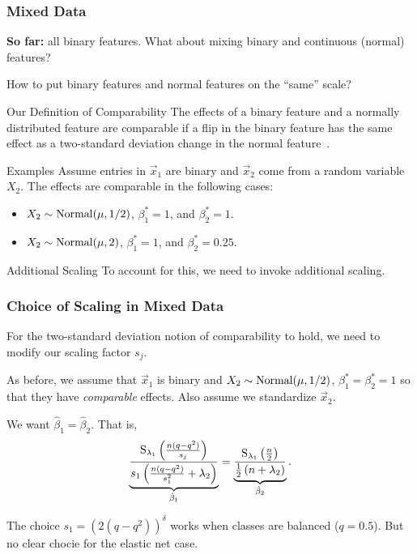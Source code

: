 \documentclass[10pt]{beamer}
\begin{document}
\begin{frame}[c]
  \frametitle{Mixed Data}

  \textbf{So far:} \alert{all} binary features. What about mixing binary and continuous (normal) features?

  \medskip

  How to put binary features and normal features on the ``same'' scale?

  \medskip\pause

  \begin{block}{Our Definition of Comparability}
    The effects of a binary feature and a normally distributed feature are \alert{comparable} if a flip in the binary feature has the same effect as a two-standard deviation change in the normal feature~\parencite{gelman2008}.
  \end{block}

  \pause

  \begin{exampleblock}{Examples}
    Assume entries in \(\vec{x}_1\) are binary and \(\vec{x}_2\) come from a random variable \(X_2\). The effects are comparable in the following cases:
    \begin{itemize}
      \item \(X_2 \sim \operatorname{Normal}(\mu, 1/2)\), \(\beta_1^* = 1\), and \(\beta_2^* = 1\).
      \item \(X_2 \sim \operatorname{Normal}(\mu, 2)\), \(\beta_1^* = 1\), and \(\beta_2^* = 0.25\).
    \end{itemize}
  \end{exampleblock}

  \pause

  \begin{block}{Additional Scaling}
    To account for this, we need to invoke additional scaling.

  \end{block}
\end{frame}

\begin{frame}[c]
  \frametitle{Choice of Scaling in Mixed Data}

  For the two-standard deviation notion of comparability to hold, we need to modify our
  scaling factor \(s_j\).

  \bigskip\pause

  As before, we assume that \(\vec{x}_1\) is binary and \(X_2 \sim \operatorname{Normal}(\mu, 1/2)\),
  \(\beta_1^* = \beta_2^* = 1\) so that they have \emph{comparable} effects. Also assume we
  standardize \(\vec{x}_2\).

  \medskip

  We want \(\hat{\beta}_1 = \hat{\beta}_2\). That is,
  \[
    \underbrace{\frac{\operatorname{S}_{\lambda_1}\left(\frac{n (q - q^2)}{s_j}\right)}{s_1\left(\frac{n(q - q^2)}{s_1^2} + \lambda_2\right)}}_{\hat{\beta}_1}  = \underbrace{\frac{\operatorname{S}_{\lambda_1}\left(\frac{n}{2}\right)}{\frac{1}{2}\left(n + \lambda_2\right)}}_{\hat{\beta}_2}.
  \]

  \medskip\pause

  The choice \(s_1 = (2 (q - q^2))^\delta\) works when classes are balanced (\(q = 0.5\)).
  But no clear chocie for the elastic net case.
\end{frame}
\end{document}
